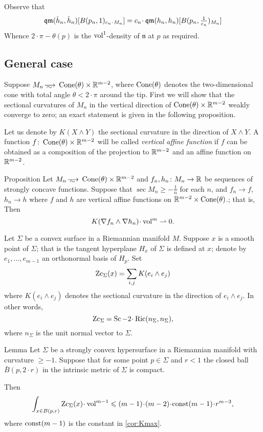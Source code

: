 Observe that 
\[\qm(\hat h_n, \hat h_n)[B(p_n,1)_{c_n\cdot M_n}]
=
c_n\cdot \qm(h_n, h_n)[B(p_n,\tfrac1{c_n})_{M_n}]\]
Whence $2\cdot \pi-\theta(p)$ is the $\operatorname{vol}^1$-density of $\mathfrak n$ at $p$ as required.
\qeds

\subsection{General case}


Suppose $M_n\smooths{} \Cone(\theta)\times \RR^{m-2}$, where $\operatorname{Cone}(\theta)$ denotes the two-dimensional cone with total angle $\theta<2\cdot\pi$ around the tip.
First we will show that the sectional curvatures of $M_n$ in the vertical direction of $\operatorname{Cone}(\theta)\times \mathbb{R}^{m-2}$ weakly converge to zero;
an exact statement is given in the following proposition.

Let us denote by $K(X\wedge Y)$ the sectional curvature in the direction of $X\wedge Y$.
A function $f\colon\operatorname{Cone}(\theta)\times\mathbb{R}^{m-2}$ will be called \emph{vertical affine function} if $f$ can be obtained as a composition of the projection to $\mathbb{R}^{m-2}$ and an affine function on $\mathbb{R}^{m-2}$.

\begin{thm}{Proposition}\label{prop:vert-vert}
Let $M_n\smooths{} \Cone(\theta)\times\RR^{m-2}$
and $f_n,h_n\colon M_n\to \mathbb{R}$ be sequences of strongly concave functions.
Suppose that $\sec M_n\ge -\tfrac1n$ for each $n$,
and $f_n\to f$, 
$h_n\to h$ where $f$ and $h$ are vertical affine functions on $\mathbb{R}^{m-2}\times \operatorname{Cone}(\theta)$.; that is, 
Then 
\[K(\nabla f_n\wedge\nabla h_n)\cdot\vol^m \rightharpoonup0.\]

\end{thm}

Let $\Sigma$ be a convex surface in a Riemannian manifold $M$.
Suppose $x$ is a smooth point of $\Sigma$; that is the tangent hyperplane $H_x$ of $\Sigma$ is defined at $x$;
denote by $e_1,\dots,e_{m-1}$ an orthonormal basis of $H_p$.
Set 
\[\operatorname{\rm Zc}_\Sigma(x)= \sum_{i,j} K(e_i\wedge e_j)\]
where $K(e_i\wedge e_j)$ denotes the sectional curvature in the direction of $e_i\wedge e_j$.
In other words, 
\[\Zc_\Sigma=\Sc-2\cdot\Ric(n_\Sigma,n_\Sigma),\]
where $n_\Sigma$ is the unit normal vector to $\Sigma$.

\begin{thm}{Lemma}\label{lem:nonsmooth-convex}
Let $\Sigma$ be a strongly convex hypersurface in a Riemannian manifold with curvature $\ge -1$.
Suppose that for some point $p\in \Sigma$ and $r<1$ the closed ball $\bar B(p,2\cdot r)$ in the intrinsic metric of $\Sigma$ is compact.

Then 
\[\int_{x\in B(p,r)}\Zc_\Sigma(x)\cdot \vol^{m-1}\le (m-1)\cdot(m-2)\cdot\const(m-1)\cdot r^{m-3},\]
where $\mathrm{const}(m-1)$ is the constant in \ref{cor:Kmax}.
\end{thm}


